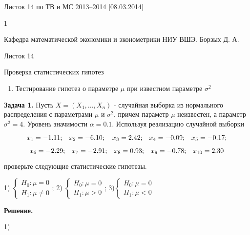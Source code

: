 

Листок 14 по ТВ и МС 2013--2014 [08.03.2014]







1

Кафедра математической экономики и эконометрики НИУ ВШЭ. Борзых Д. А.

Листок 14

Проверка статистических гипотез



\begin{enumerate}
\item  Тестирование гипотез о параметре $\mu $ при известном параметре \textbf{$\sigma ^{2} $}
\end{enumerate}

 

\textbf{Задача 1.} Пусть $X=\left(X_{1} ,...,X_{n} \right)$ - случайная выборка из нормального распределения с параметрами $\mu $ и $\sigma ^{2} $, причем параметр $\mu $ неизвестен, а параметр $\sigma ^{2} =4$. Уровень значимости $\alpha =0.1$. Используя реализацию случайной выборки 

\[x_{1} =-{\rm 1.11;}\quad x_{2} =-{\rm 6.1}0;\quad x_{3} ={\rm 2.42;}\quad x_{4} =-0.0{\rm 9;}\quad x_{5} =-0.{\rm 17;}\] 

\[x_{6} =-{\rm 2.29;}\quad x_{7} =-{\rm 2.91;}\quad x_{8} =0.{\rm 93;}\quad x_{9} =-0.{\rm 78;}\quad x_{10} ={\rm 2.3}0\] 

проверьте следующие статистические гипотезы.

1) $\left\{\begin{array}{l} {H_{0} :\mu =0} \\ {H_{1} :\mu \ne 0} \end{array}\right. $;             2) $\left\{\begin{array}{l} {H_{0} :\mu =0} \\ {H_{1} :\mu >0} \end{array}\right. $;             3)$\left\{\begin{array}{l} {H_{0} :\mu =0} \\ {H_{1} :\mu <0} \end{array}\right. $

\textbf{Решение.}

1) 

